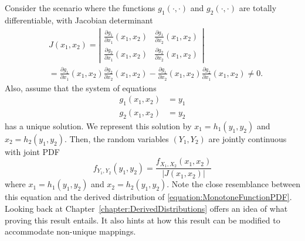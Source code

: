 Consider the scenario where the functions $g_1 (\cdot, \cdot)$ and $g_2 (\cdot, \cdot)$ are totally differentiable, with Jacobian determinant
\begin{equation*}
\begin{split}
&J(x_1, x_2) = \left| \begin{array}{cc}
\frac{\partial g_1}{\partial x_1} (x_1, x_2) &
\frac{\partial g_1}{\partial x_2} (x_1, x_2) \\
\frac{\partial g_2}{\partial x_1} (x_1, x_2) &
\frac{\partial g_2}{\partial x_2} (x_1, x_2)
\end{array} \right| \\
&= \frac{\partial g_1}{\partial x_1} (x_1, x_2)
\frac{\partial g_2}{\partial x_2} (x_1, x_2)
- \frac{\partial g_1}{\partial x_2} (x_1, x_2)
\frac{\partial g_2}{\partial x_1} (x_1, x_2)
\neq 0 .
\end{split}
\end{equation*}
Also, assume that the system of equations
\begin{align*}
g_1 (x_1, x_2) &= y_1 \\
g_2 (x_1, x_2) &= y_2
\end{align*}
has a unique solution.
We represent this solution by $x_1 = h_1 (y_1, y_2)$ and $x_2 = h_2 (y_1, y_2)$.
Then, the random variables $(Y_1, Y_2)$ are jointly continuous with joint PDF
\begin{equation} \label{equation:DerivedJointPDF}
f_{Y_1, Y_2} (y_1, y_2) =
\frac{f_{X_1, X_2} (x_1, x_2)}{ | J(x_1, x_2) |}
\end{equation}
where $x_1 = h_1 (y_1, y_2)$ and $x_2 = h_2 (y_1, y_2)$.
Note the close resemblance between this equation and the derived distribution of \eqref{equation:MonotoneFunctionPDF}.
Looking back at Chapter~\ref{chapter:DerivedDistributions} offers an idea of what proving this result entails.
It also hints at how this result can be modified to accommodate non-unique mappings.

